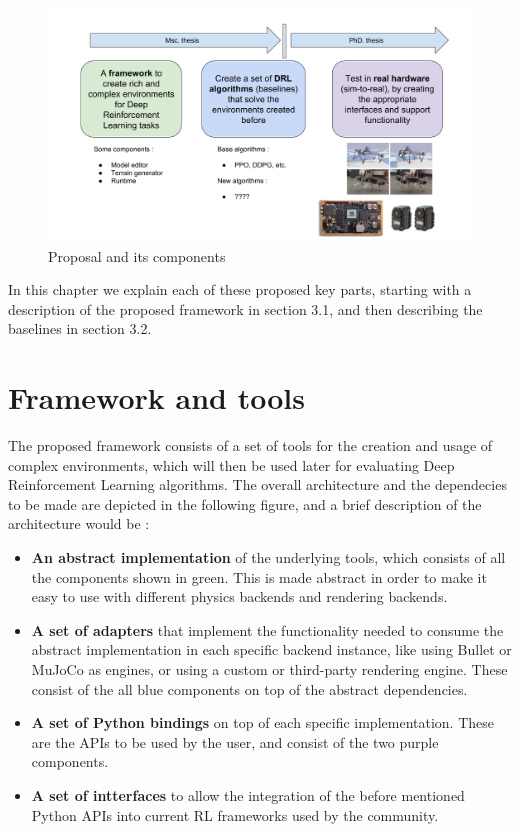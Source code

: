 \begin{figure}
    \centering
    \includegraphics[width=6in]{./chapters/imgs/img_proposal.png}
    \caption[img_proposal]{Proposal and its components}
    \label{fig:img_proposal}
\end{figure}

In this chapter we explain each of these proposed key parts, starting with a description of the proposed 
framework in section 3.1, and then describing the baselines in section 3.2.

\section{Framework and tools}

The proposed framework consists of a set of tools for the creation and usage of complex environments, which
will then be used later for evaluating Deep Reinforcement Learning algorithms. The overall architecture and 
the dependecies to be made are depicted in the following figure, and a brief description of the architecture
would be :

\begin{itemize}
    \item \textbf{An abstract implementation} of the underlying tools, which consists of all the components shown
        in green. This is made abstract in order to make it easy to use with different physics backends and rendering
        backends.
    \item \textbf{A set of adapters} that implement the functionality needed to consume the abstract implementation
        in each specific backend instance, like using Bullet or MuJoCo as engines, or using a custom or third-party
        rendering engine. These consist of the all blue components on top of the abstract dependencies.
    \item \textbf{A set of Python bindings} on top of each specific implementation. These are the APIs to be used
        by the user, and consist of the two purple components.
    \item \textbf{A set of intterfaces} to allow the integration of the before mentioned Python APIs into current
        RL frameworks used by the community.
\end{itemize}


